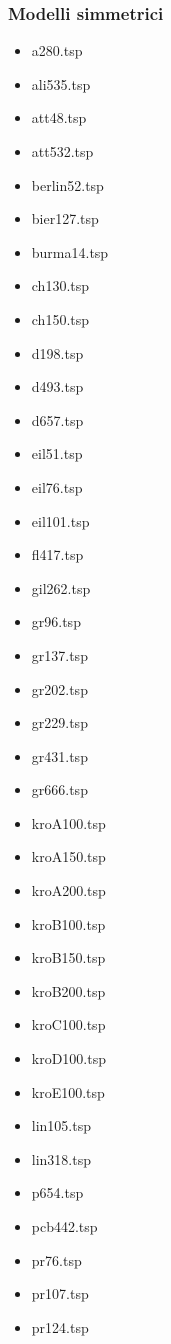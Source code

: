 \subsubsection{Modelli simmetrici}
\begin{center}
\begin{multicols}{4}
\begin{itemize}
\item{a280.tsp}
\item{ali535.tsp}
\item{att48.tsp}
\item{att532.tsp}
\item{berlin52.tsp}
\item{bier127.tsp}
\item{burma14.tsp}
\item{ch130.tsp}
\item{ch150.tsp}
\item{d198.tsp}
\item{d493.tsp}
\item{d657.tsp}
\item{eil51.tsp}
\item{eil76.tsp}
\item{eil101.tsp}
\item{fl417.tsp}
\item{gil262.tsp}
\item{gr96.tsp}
\item{gr137.tsp}
\item{gr202.tsp}
\item{gr229.tsp}
\item{gr431.tsp}
\item{gr666.tsp}
\item{kroA100.tsp}
\item{kroA150.tsp}
\item{kroA200.tsp}
\item{kroB100.tsp}
\item{kroB150.tsp}
\item{kroB200.tsp}
\item{kroC100.tsp}
\item{kroD100.tsp}
\item{kroE100.tsp}
\item{lin105.tsp}
\item{lin318.tsp}
\item{p654.tsp}
\item{pcb442.tsp}
\item{pr76.tsp}
\item{pr107.tsp}
\item{pr124.tsp}

\end{itemize}
\end{multicols}
\end{center}
